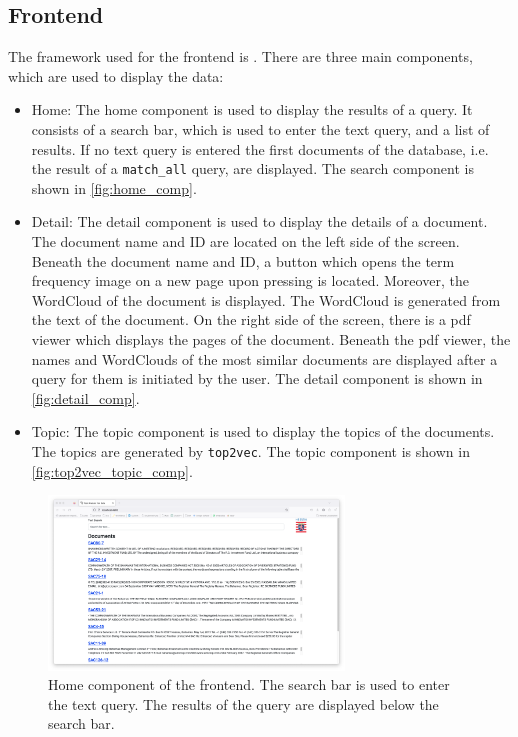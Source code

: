 \subsection{Frontend}\label{subsec:frontend}

The framework used for the frontend is \angular{}.
There are three main components, which are used to display the data:

\begin{itemize}
    \item \label{pt:home}Home: 
        The home component is used to display the results of a query.
        It consists of a search bar, which is used to enter the text query, and a list of results.
        If no text query is entered the first documents of the database, i.e. the result of a \texttt{match\_all} query, are displayed.
        The search component is shown in \autoref{fig:home_comp}.

    \item \label{pt:detail}Detail: 
        The detail component is used to display the details of a document.
        The document name and ID are located on the left side of the screen.
        Beneath the document name and ID, a button which opens the term frequency image on a new page upon pressing is located. 
        Moreover, the WordCloud of the document is displayed.
        The WordCloud is generated from the text of the document.
        On the right side of the screen, there is a \ac{pdf} viewer which displays the pages of the document.
        Beneath the \ac{pdf} viewer, the names and WordClouds of the most similar documents are displayed after a query for them is initiated by the user.
        The detail component is shown in \autoref{fig:detail_comp}.

    \item \label{pt:topic}Topic: 
        The topic component is used to display the topics of the documents.
        The topics are generated by \texttt{top2vec}.
        The topic component is shown in \autoref{fig:top2vec_topic_comp}.
\end{itemize}


\begin{figure}[htp] %
    \centering
    \includegraphics[width=0.7\textwidth]{images/UI/Home_component.png}
    \caption{Home component of the frontend.
    The search bar is used to enter the text query.
    The results of the query are displayed below the search bar.
    }
    \label{fig:home_comp}
\end{figure}


